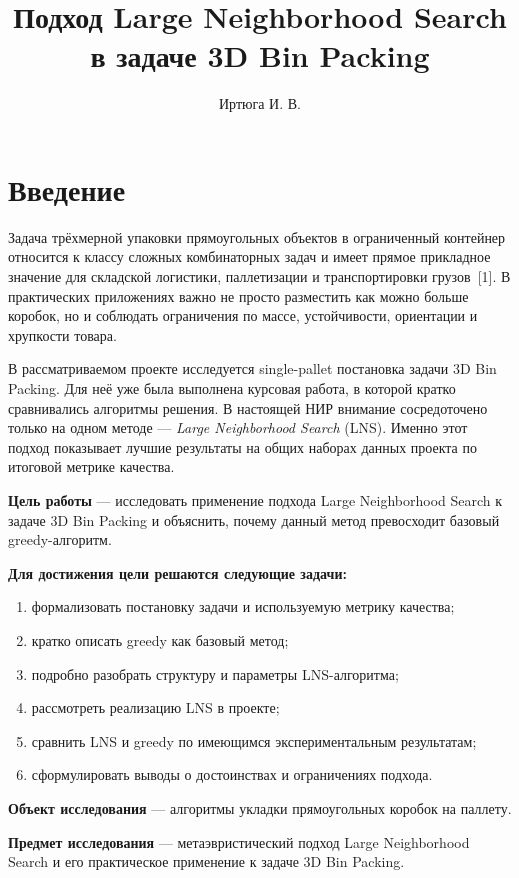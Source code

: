 \documentclass[12pt,a4paper]{article}
\title{Подход Large Neighborhood Search в задаче 3D Bin Packing}
\author{Иртюга И. В.}
\begin{document}
\maketitle
\tableofcontents
\newpage

\section{Введение}

Задача трёхмерной упаковки прямоугольных объектов в ограниченный контейнер относится к классу сложных комбинаторных задач и имеет прямое прикладное значение для складской логистики, паллетизации и транспортировки грузов~[1]. В практических приложениях важно не просто разместить как можно больше коробок, но и соблюдать ограничения по массе, устойчивости, ориентации и хрупкости товара.

В рассматриваемом проекте исследуется single-pallet постановка задачи 3D Bin Packing. Для неё уже была выполнена курсовая работа, в которой кратко сравнивались алгоритмы решения. В настоящей НИР внимание сосредоточено только на одном методе --- \textit{Large Neighborhood Search} (LNS). Именно этот подход показывает лучшие результаты на общих наборах данных проекта по итоговой метрике качества.

\textbf{Цель работы} --- исследовать применение подхода Large Neighborhood Search к задаче 3D Bin Packing и объяснить, почему данный метод превосходит базовый greedy-алгоритм.

\textbf{Для достижения цели решаются следующие задачи:}
\begin{enumerate}
  \item формализовать постановку задачи и используемую метрику качества;
  \item кратко описать greedy как базовый метод;
  \item подробно разобрать структуру и параметры LNS-алгоритма;
  \item рассмотреть реализацию LNS в проекте;
  \item сравнить LNS и greedy по имеющимся экспериментальным результатам;
  \item сформулировать выводы о достоинствах и ограничениях подхода.
\end{enumerate}

\textbf{Объект исследования} --- алгоритмы укладки прямоугольных коробок на паллету.

\textbf{Предмет исследования} --- метаэвристический подход Large Neighborhood Search и его практическое применение к задаче 3D Bin Packing.
\end{document}
